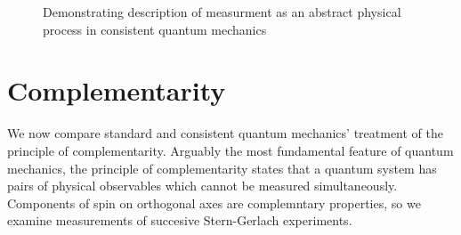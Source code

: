 \begin{figure}
\centering\CaptionFontSize
{}
\caption[Insert an abbreviated caption here to show in the List of Figures]
{Demonstrating description of measurment as an abstract physical process in consistent quantum mechanics}
\label{Figure:Intro:FigureExampleB}
\end{figure}

\section{Complementarity}

We now compare standard and consistent quantum mechanics' treatment of the principle of complementarity. Arguably the most fundamental feature of quantum mechanics, the principle of complementarity states that a quantum system has pairs of physical observables which cannot be measured simultaneously. Components of spin on orthogonal axes are complemntary properties, so we examine measurements of succesive Stern-Gerlach experiments.

